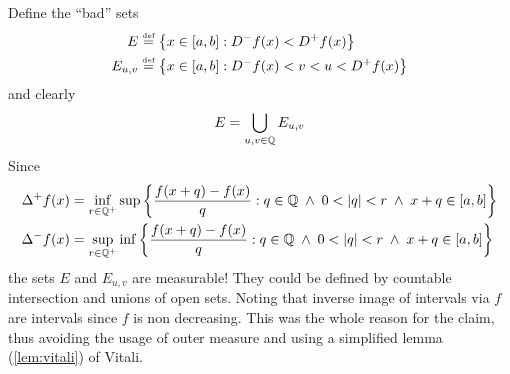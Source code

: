 \begin{thmproof}
Define the ``bad'' sets
\begin{align}
E       &\stackrel{\mbox{\upshape\tiny def}}{=} \left\{x\in[a,b]: D^-f(x) < D^+f(x)\right\} \notag \\
E_{u,v} &\stackrel{\mbox{\upshape\tiny def}}{=} \left\{x\in[a,b]: D^-f(x) < v < u < D^+f(x)\right\} 
        \label{eq:7:Euv}
\end{align}
and clearly
\begin{equation} \label{eq:ex7.14:Eu}
E = \bigcup_{u,v\in\mathbb{Q}} E_{u,v}
\end{equation}
Since 
\begin{align*}
\Delta^+f(x) &= \inf_{r\in\Q^+} 
    \sup\left\{ \frac{f(x+q)-f(x)}{q} :
                q\in\Q \swedge 0<|q|<r \swedge x+q\in[a,b] \right\}
\\
\Delta^-f(x) &= \sup_{r\in\Q^+} 
    \inf\left\{ \frac{f(x+q)-f(x)}{q} :
                q\in\Q \swedge 0<|q|<r \swedge x+q\in[a,b] \right\}
\end{align*}
the sets $E$ and \(E_{u,v}\) are measurable! They could be defined
by countable intersection and unions of open sets.
Noting that inverse image of intervals via $f$ are intervals since
$f$ is non decreasing.
This was 
the whole reason for the claim, thus avoiding the usage of outer measure
and using a simplified lemma (\ref{lem:vitali}) of Vitali.


\end{thmproof}
